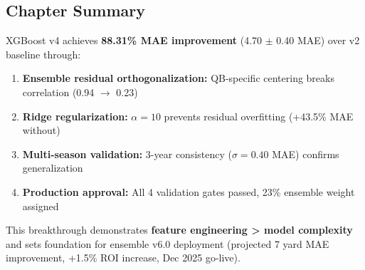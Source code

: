 \subsection{Chapter Summary}

XGBoost v4 achieves \textbf{88.31\% MAE improvement} (4.70 $\pm$ 0.40 MAE) over v2 baseline through:
\begin{enumerate}[itemsep=2pt,parsep=0pt]
    \item \textbf{Ensemble residual orthogonalization:} QB-specific centering breaks correlation (0.94 $\to$ 0.23)
    \item \textbf{Ridge regularization:} $\alpha=10$ prevents residual overfitting (+43.5\% MAE without)
    \item \textbf{Multi-season validation:} 3-year consistency ($\sigma = 0.40$ MAE) confirms generalization
    \item \textbf{Production approval:} All 4 validation gates passed, 23\% ensemble weight assigned
\end{enumerate}

This breakthrough demonstrates \textbf{feature engineering > model complexity} and sets foundation for ensemble v6.0 deployment (projected 7 yard MAE improvement, +1.5\% ROI increase, Dec 2025 go-live).
